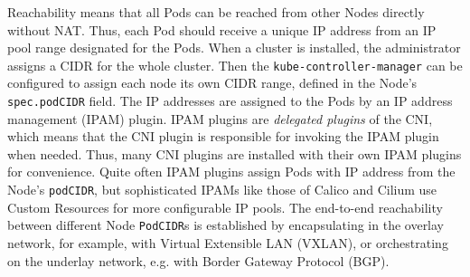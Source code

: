 \documentclass[english, 12pt, a4paper, sci, utf8, a-2b, online]{aaltothesis}
\begin{document}
Reachability means that all Pods can be reached from other Nodes directly without NAT.
Thus, each Pod should receive a unique IP address from an IP pool range designated for the Pods.
When a cluster is installed, the administrator assigns a CIDR for the whole cluster.
Then the \texttt{kube-controller-manager} can be configured to assign each node its own CIDR range, defined in the Node's \texttt{spec.podCIDR} field.
The IP addresses are assigned to the Pods by an IP address management (IPAM) plugin.
IPAM plugins are \emph{delegated plugins} of the CNI, which means that the CNI plugin is responsible for invoking the IPAM plugin when needed.
Thus, many CNI plugins are installed with their own IPAM plugins for convenience.
Quite often IPAM plugins assign Pods with IP address from the Node's \texttt{podCIDR}, but sophisticated IPAMs like those of Calico and Cilium use Custom Resources for more configurable IP pools.
The end-to-end reachability between different Node \texttt{PodCIDR}s is established by encapsulating in the overlay network, for example, with Virtual Extensible LAN (VXLAN), or orchestrating on the underlay network, e.g. with Border Gateway Protocol (BGP).


\end{document}
